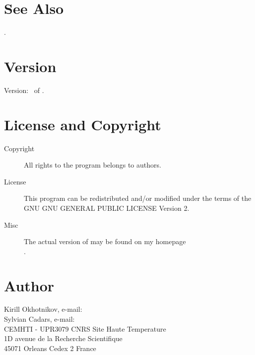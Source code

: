 \documentclass[a4paper,english]{article}
\begin{document}
\section{See Also}

.


\section{Version}

Version: \Version\ of \Date.

\section{License and Copyright}

\begin{description}
\item[Copyright] 
     All rights to the program belongs to authors.

\item[License] This program can be redistributed and/or modified under the
     terms of the GNU GNU GENERAL PUBLIC LICENSE Version 2.

\item[Misc]
     The actual version of   may be found on my homepage\\
     .

\end{description}

\section{Author}
Kirill Okhotnikov, e-mail:  \\
Sylvian Cadars, e-mail:  \\ 
CEMHTI - UPR3079 CNRS Site Haute Temperature \\
1D avenue de la Recherche Scientifique \\
45071 Orleans Cedex 2 France
\noindent

\LatexManEnd
\end{document}
